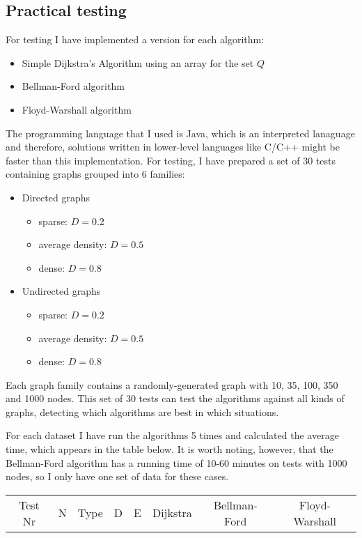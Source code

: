 \documentclass[runningheads]{llncs}
\begin{document}
\subsection{Practical testing}
For testing I have implemented a version for each algorithm:
\begin{itemize}
	\item Simple Dijkstra's Algorithm using an array for the set $Q$
	\item Bellman-Ford algorithm
	\item Floyd-Warshall algorithm
\end{itemize}

The programming language that I used is Java, which is an interpreted lanaguage and therefore, solutions written in lower-level languages like C/C++ might be faster than this implementation. For testing, I have prepared a set of 30 tests containing graphs grouped into 6 families:
\begin{itemize}
	\item Directed graphs
	\begin{itemize}
		\item sparse: $D=0.2$
		\item average density: $D=0.5$
		\item dense: $D=0.8$
	\end{itemize}
	\item Undirected graphs
	\begin{itemize}
		\item sparse: $D=0.2$
		\item average density: $D=0.5$
		\item dense: $D=0.8$
	\end{itemize}
\end{itemize}

Each graph family contains a randomly-generated graph with 10, 35, 100, 350 and 1000 nodes. This set of 30 tests can test the algorithms against all kinds of graphs, detecting which algorithms are best in which situations.

For each dataset I have run the algorithms 5 times and calculated the average time, which appears in the table below. It is worth noting, however, that the Bellman-Ford algorithm has a running time of 10-60 minutes on tests with 1000 nodes, so I only have one set of data for these cases.
\begin{center}
\begin{tabular}{|c|c|c|c|c|c|c|c|}
Test Nr & N	 & Type & D & E & Dijkstra & Bellman-Ford& Floyd-Warshall
\end{tabular}
\end{center}
\end{document}
